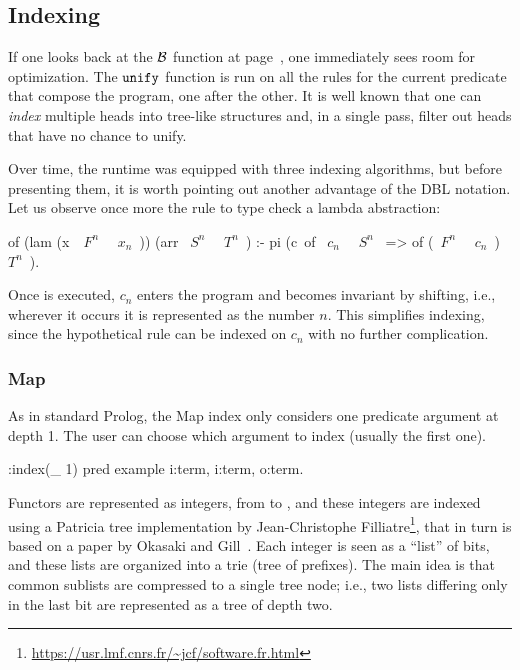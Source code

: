 \documentclass{these-ISSS}
\newenvironment{elpicode}
  {\VerbatimEnvironment\begin{elpibox}\begin{xelpicode}}{\end{xelpicode}
\end{elpibox}}
\begin{document}
\subsection{Indexing}

If one looks back at the $\mathcal{B}$ function at page~\pageref{backchain},
one immediately sees room for optimization. The $\texttt{unify}$ function is
run on all the rules for the current predicate that compose the program,
one after the other. It is well known that one can \emph{index} multiple heads
into tree-like structures and, in a single pass, filter out heads that have
no chance to unify.

Over time, the runtime was equipped with three indexing algorithms, but before
presenting them, it is worth pointing out another advantage of the DBL
notation. Let us observe once more the rule to type check a lambda abstraction:

\begin{elpicode}
of (lam (x\ ~$F^n$~ ~$x_n$~)) (arr ~$S^n$~ ~$T^n$~) :-
  pi (c\ of ~$c_n$~ ~$S^n$~ => of (~$F^n$~ ~$c_n$~) ~$T^n$~).
\end{elpicode}

\noindent
Once  is executed, $c_n$ enters the program and becomes invariant by
shifting, i.e., wherever it occurs it is represented as the number $n$. This
simplifies indexing, since the hypothetical rule 
can be indexed on $c_n$ with no further complication.

\subsubsection{Map}


As in standard Prolog, the Map index only considers one predicate argument at
depth 1. The user can choose which argument to index (usually the first one).

\begin{elpicode}
:index(_ 1) %
pred example i:term, i:term, o:term.
\end{elpicode}

\noindent
Functors are represented as integers, from  to , and
these integers are indexed using a Patricia tree implementation by
Jean-Christophe Filliatre\footnote{\url{https://usr.lmf.cnrs.fr/~jcf/software.fr.html}},
that in turn is based on a paper by Okasaki and Gill~\cite{Okasaki:98:IntMap}.
Each integer is
seen as a ``list'' of bits, and these lists are organized into a trie (tree of
prefixes). The main idea is that common sublists are compressed to a single
tree node; i.e., two lists differing only in the last bit are represented as a
tree of depth two.
\end{document}
